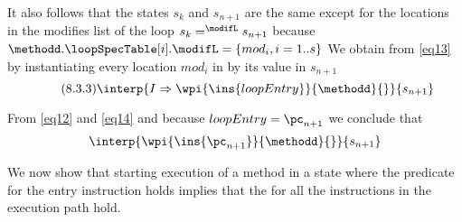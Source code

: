 \begin{description}
It also follows that the states $s_k$ and $s_{n+1}$ are the same except for the locations in the
 modifies list \modifL{} of the loop  $    s_k =^{\modifL} s_{n+1}   $
 because $ \methodd. \loopSpecTable[i].\modifL =\{ mod_i, i = 1..s \}$  
 We obtain from  \eqref{eq13} by instantiating every location $mod_i$ in  
 by its value in $s_{n+1}$
 \begin{equation*} \label{eq14} \tag{8.3.3} 
 \interp { I \Rightarrow \wpi{\ins{loopEntry}}{\methodd}{}} {s_{n+1}}    
\end{equation*}

From \eqref{eq12} and \eqref{eq14} and  because $loopEntry = \pc_{n +1}$ we conclude that 
\begin{equation*} 	  \interp{ \wpi{\ins{\pc_{n+1}} }{\methodd}{} }{s_{n+1}} \end{equation*}
         

\end{description}

\Qed

We now show that starting execution of a method in a state where the \fwpi{}
 predicate for the entry instruction holds implies that the  
\fwpi{} for all the instructions in the execution path hold. 

